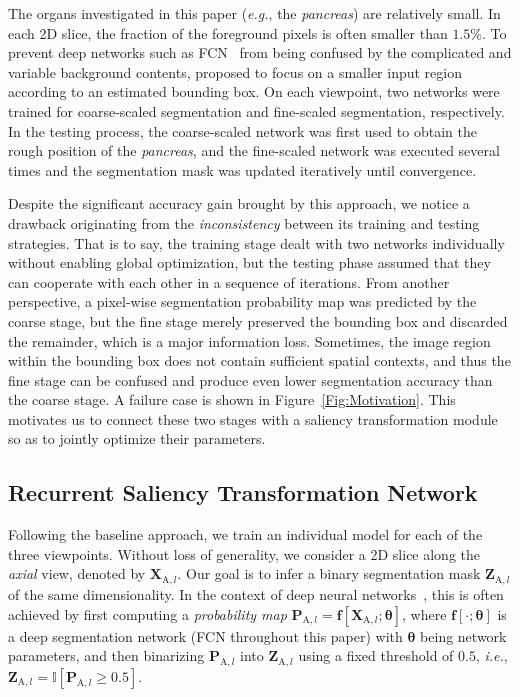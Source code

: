 \documentclass[10pt,twocolumn,letterpaper]{article}
\begin{document}
The organs investigated in this paper ({\em e.g.}, the {\em pancreas}) are relatively small.
In each 2D slice, the fraction of the foreground pixels is often smaller than $1.5\%$.
To prevent deep networks such as FCN~\cite{Long_2015_Fully} from being confused by the complicated and variable background contents,
\cite{Zhou_2017_Fixed} proposed to focus on a smaller input region according to an estimated bounding box.
On each viewpoint, two networks were trained for coarse-scaled segmentation and fine-scaled segmentation, respectively.
In the testing process, the coarse-scaled network was first used to obtain the rough position of the {\em pancreas},
and the fine-scaled network was executed several times and the segmentation mask was updated iteratively until convergence.

Despite the significant accuracy gain brought by this approach,
we notice a drawback originating from the {\em inconsistency} between its training and testing strategies.
That is to say, the training stage dealt with two networks individually without enabling global optimization,
but the testing phase assumed that they can cooperate with each other in a sequence of iterations.
From another perspective, a pixel-wise segmentation probability map was predicted by the coarse stage,
but the fine stage merely preserved the bounding box and discarded the remainder, which is a major information loss.
Sometimes, the image region within the bounding box does not contain sufficient spatial contexts,
and thus the fine stage can be confused and produce even lower segmentation accuracy than the coarse stage.
A failure case is shown in Figure~\ref{Fig:Motivation}.
This motivates us to connect these two stages with a saliency transformation module so as to jointly optimize their parameters.


\subsection{Recurrent Saliency Transformation Network}
\label{Approach:Formulation}

Following the baseline approach, we train an individual model for each of the three viewpoints.
Without loss of generality, we consider a 2D slice along the {\em axial} view, denoted by $\mathbf{X}_{\mathrm{A},l}$.
Our goal is to infer a binary segmentation mask $\mathbf{Z}_{\mathrm{A},l}$ of the same dimensionality.
In the context of deep neural networks~\cite{Long_2015_Fully}\cite{Chen_2015_Semantic},
this is often achieved by first computing a {\em probability map}
${\mathbf{P}_{\mathrm{A},l}}={\mathbf{f}\!\left[\mathbf{X}_{\mathrm{A},l};\boldsymbol{\theta}\right]}$,
where $\mathbf{f}\!\left[\cdot;\boldsymbol{\theta}\right]$ is a deep segmentation network
(FCN throughout this paper) with $\boldsymbol{\theta}$ being network parameters,
and then binarizing $\mathbf{P}_{\mathrm{A},l}$ into $\mathbf{Z}_{\mathrm{A},l}$ using a fixed threshold of $0.5$,
{\em i.e.}, ${\mathbf{Z}_{\mathrm{A},l}}={\mathbb{I}\!\left[\mathbf{P}_{\mathrm{A},l}\geqslant0.5\right]}$.
\end{document}
